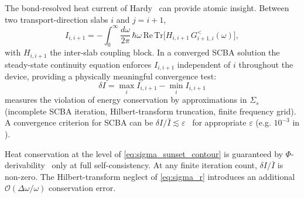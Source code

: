 The bond-resolved heat current of Hardy~\cite{hardy_energy-flux_1963} can provide atomic insight.
Between two transport-direction slabs $i$
and $j = i + 1$,
\begin{equation}\label{eq:I_local}
  I_{i,i+1}
  = -\int_0^\infty\!\frac{d\omega}{2\pi}\,\hbar\omega\,
    \mathrm{Re}\,\mathrm{Tr}\bigl[H_{i,i+1}\,G^<_{i+1,i}(\omega)\bigr],
\end{equation}
with $H_{i,i+1}$ the inter-slab coupling block. In a converged SCBA
solution the steady-state continuity equation enforces $I_{i,i+1}$
independent of $i$ throughout the device, providing a physically meaningful convergence test:
\begin{equation}
  \delta I = \max_i I_{i,i+1} - \min_i I_{i,i+1}
\end{equation}
measures the violation of energy conservation by approximations in
$\Sigma_s$ (incomplete SCBA iteration, Hilbert-transform truncation,
finite frequency grid). A convergence criterion for SCBA can be
$\delta I/\bar I \lesssim \varepsilon$~\cite{luisier_atomistic_2012,guo_quantum_2020} for
appropriate $\varepsilon$ (e.g. $10^{-3}$ in \cite{guo_quantum_2020}).

Heat conservation at the level of \cref{eq:sigma_sunset_contour}
is guaranteed by $\Phi$-derivability~\cite{baym_self-consistent_1962} only at full
self-consistency. At any finite iteration count, $\delta I/\bar I$ is
non-zero. The Hilbert-transform neglect of \cref{eq:sigma_r} introduces an additional
$\mathcal{O}(\Delta\omega/\omega)$ conservation error.

